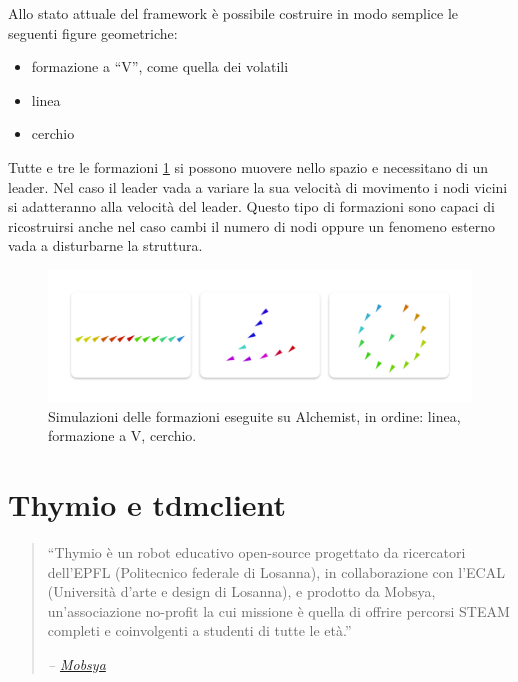 \documentclass[12pt,a4paper,openright,twoside]{book}
\begin{document}
Allo stato attuale del framework è possibile costruire in modo semplice le seguenti figure geometriche:
\begin{itemize}
    \item formazione a ``V'', come quella dei volatili
    \item linea
    \item cerchio
\end{itemize}

Tutte e tre le formazioni \cref{fig:formation-simulations} \cite{Macroswarm} si possono muovere nello spazio e necessitano di un leader. Nel caso il leader vada a variare la sua velocità di movimento i nodi vicini si adatteranno alla velocità del leader. Questo tipo di formazioni sono capaci di ricostruirsi anche nel caso cambi il numero di nodi oppure un fenomeno esterno vada a disturbarne la struttura.

\begin{figure}
    \centering
    \includegraphics[width=.9\linewidth]{figures/formation-simulations.pdf}
    \caption{Simulazioni delle formazioni eseguite su Alchemist, in ordine: linea, formazione a V, cerchio.}
    \label{fig:formation-simulations}
\end{figure}

\section{Thymio e tdmclient}

\begin{quote}
    \raggedright
    ``Thymio è un robot educativo open-source progettato da ricercatori dell'EPFL (Politecnico federale di Losanna), in collaborazione con l'ECAL (Università d'arte e design di Losanna), e prodotto da Mobsya, un'associazione no-profit la cui missione è quella di offrire percorsi STEAM completi e coinvolgenti a studenti di tutte le età.''
    \begin{flushright}
        \textit{-- \href{https://www.thymio.org/}{Mobsya}}
    \end{flushright}
\end{quote}
\end{document}
